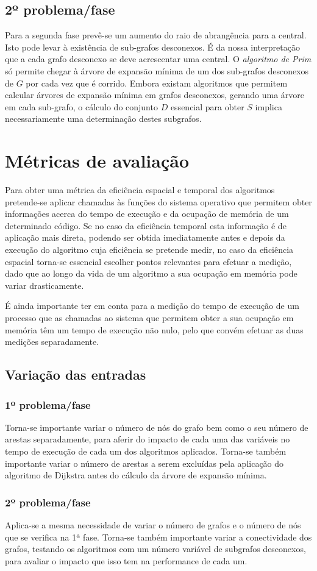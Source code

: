 \documentclass[a4paper,12pt,titlepage]{article}
\begin{document}
\subsection{2º problema/fase}
Para a segunda fase prevê-se um aumento do raio de abrangência para a central. Isto pode levar à existência de sub-grafos desconexos. É da nossa interpretação que a cada grafo desconexo se deve acrescentar uma central. O \emph{algoritmo de Prim} só permite chegar à árvore de expansão mínima de um dos sub-grafos desconexos de $G$ por cada vez que é corrido. Embora existam algoritmos que permitem calcular árvores de expansão mínima em grafos desconexos, gerando uma árvore em cada sub-grafo, o cálculo do conjunto $D$ essencial para obter $S$ implica necessariamente uma determinação destes subgrafos.




\section{Métricas de avaliação}
Para obter uma métrica da eficiência espacial e temporal dos algoritmos pretende-se aplicar chamadas às funções do sistema operativo que permitem obter informações acerca do tempo de execução e da ocupação de memória de um determinado código. Se no caso da eficiência temporal esta informação é de aplicação mais direta, podendo ser obtida imediatamente antes e depois da execução do algoritmo cuja eficiência se pretende medir, no caso da eficiência espacial torna-se essencial escolher pontos relevantes para efetuar a medição, dado que ao longo da vida de um algoritmo a sua ocupação em memória pode variar drasticamente.
 
É ainda importante ter em conta para a medição do tempo de execução de um processo que as chamadas ao sistema que permitem obter a sua ocupação em memória têm um tempo de execução não nulo, pelo que convém efetuar as duas medições separadamente.
\subsection{Variação das entradas}
\subsubsection{1º problema/fase}
Torna-se importante variar o número de nós do grafo bem como o seu número de arestas separadamente, para aferir do impacto de cada uma das variáveis no tempo de execução de cada um dos algoritmos aplicados. Torna-se também importante variar o número de arestas a serem excluídas pela aplicação do algoritmo de Dijkstra antes do cálculo da árvore de expansão mínima. 
\subsubsection{2º problema/fase}
Aplica-se a mesma necessidade de variar o número de grafos e o número de nós que se verifica na 1ª fase. Torna-se também importante variar a conectividade dos grafos, testando os algoritmos com um número variável de subgrafos desconexos, para avaliar o impacto que isso tem na performance de cada um.




\newpage


\end{document}
